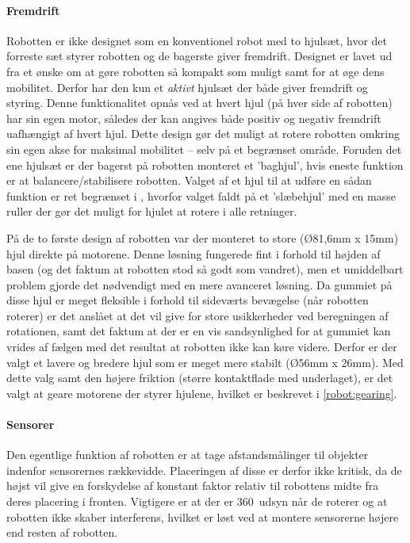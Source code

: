 \paragraph{Fremdrift}
Robotten er ikke designet som en konventionel robot med to hjulsæt, hvor det forreste sæt styrer robotten og de bagerste giver fremdrift.
Designet er lavet ud fra et ønske om at gøre robotten så kompakt som muligt samt for at øge dens mobilitet.
Derfor har den kun et \textit{aktivt} hjulsæt der både giver fremdrift og styring.
Denne funktionalitet opnås ved at hvert hjul (på hver side af robotten) har sin egen motor, således der kan angives både positiv og negativ fremdrift uafhængigt af hvert hjul.
Dette design gør det muligt at rotere robotten omkring sin egen akse for maksimal mobilitet -- selv på et begrænset område.
Foruden det ene hjulsæt er der bagerst på robotten monteret et 'baghjul', hvis eneste funktion er at balancere/stabilisere robotten.
Valget af et hjul til at udføre en sådan funktion er ret begrænset i \lego, hvorfor valget faldt på et 'slæbehjul' med en masse ruller der gør det muligt for hjulet at rotere i alle retninger.

På de to første design af robotten var der monteret to store (Ø81,6mm x 15mm) hjul direkte på motorene.
Denne løsning fungerede fint i forhold til højden af basen (og det faktum at robotten stod så godt som vandret), men et umiddelbart problem gjorde det nødvendigt med en mere avanceret løsning. 
Da gummiet på disse hjul er meget fleksible i forhold til sideværts bevægelse (når robotten roterer) er det anslået at det vil give for store usikkerheder ved beregningen af rotationen, samt det faktum at der er en vis sandsynlighed for at gummiet kan vrides af fælgen med det resultat at robotten ikke kan køre videre.
Derfor er der valgt et lavere og bredere hjul som er meget mere stabilt (Ø56mm x 26mm).
Med dette valg samt den højere friktion (større kontaktflade med underlaget), er det valgt at geare motorene der styrer hjulene, hvilket er beskrevet i \cref{robot:gearing}.

\paragraph{Sensorer}
Den egentlige funktion af robotten er at tage afstandsmålinger til objekter indenfor sensorernes rækkevidde.
Placeringen af disse er derfor ikke kritisk, da de højst vil give en forskydelse af konstant faktor relativ til robottens midte fra deres placering i fronten.
Vigtigere er at der er 360\degree~udsyn når de roterer og at robotten ikke skaber interferens, hvilket er løst ved at montere sensorerne højere end resten af robotten. 





